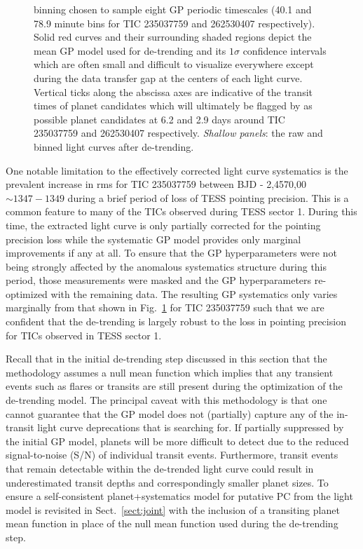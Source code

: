 \begin{figure}
{    binning chosen to sample eight GP periodic timescales (40.1 and 78.9 minute bins for TIC 235037759
    and 262530407 respectively). Solid red curves and their surrounding shaded regions
    depict the mean GP model used for de-trending and its $1\sigma$ confidence intervals which are often
    small and difficult to visualize everywhere except during the data transfer gap at the centers of each
    light curve. Vertical ticks along the abscissa axes are indicative of the transit times of planet
    candidates which will ultimately be flagged by \pipeline{} as possible planet candidates at
    6.2 and 2.9 days around TIC 235037759 and 262530407 respectively. \emph{Shallow panels}: the raw and binned light curves after de-trending.}
  \label{fig:detrend}
\end{figure}

One notable limitation to the effectively corrected light curve systematics is the prevalent increase
in rms for TIC 235037759 between BJD - 2,4570,00 $\sim 1347-1349$ during a brief period of loss of
TESS pointing precision.  This is a common feature to
many of the TICs observed during TESS sector 1. During this time, the extracted light curve is only
partially corrected for the pointing precision loss while the systematic GP model provides only marginal
improvements if any at all.
To ensure that the GP hyperparameters were not being strongly affected by the anomalous systematics structure
during this period, those measurements were masked and the GP hyperparameters re-optimized with the
remaining data. The resulting GP systematics only varies marginally from that shown in
Fig.~\ref{fig:detrend} for TIC 235037759 such that we are confident that the \pipeline{} de-trending is
largely robust to the loss in pointing precision for TICs observed in TESS sector 1.

Recall that in the initial de-trending step discussed in this section that the methodology
assumes a null mean function which implies that any transient events such as flares or transits are still
present during the optimization of the de-trending model.
The principal caveat with this methodology is that one cannot guarantee
that the GP model does not (partially) capture any of the in-transit light curve deprecations that
\pipeline{} is searching for. If partially suppressed by the initial GP model, planets will be more
difficult to detect due to the reduced signal-to-noise (S/N) of individual transit events.
Furthermore, transit events
that remain detectable within the de-trended light curve could result in underestimated transit depths
and correspondingly smaller planet sizes. To ensure a self-consistent planet+systematics model
for putative PC from \pipeline{,} the light model is revisited in Sect.~\ref{sect:joint}
with the inclusion of a transiting planet mean function in place of the null mean function used during
the de-trending step.


